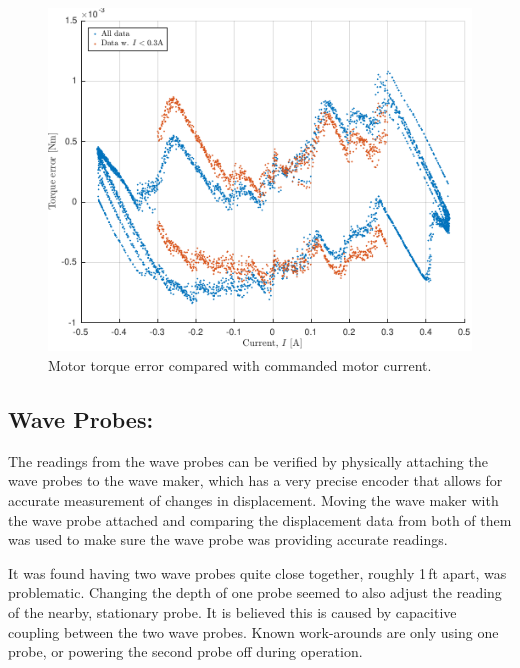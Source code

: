 \documentclass[hardware,article,submit,pdftex,moreauthors]{Definitions/mdpi}
\begin{document}
\begin{figure}[tb]
  \centering
  \includegraphics[width=1\textwidth]{diagrams/torque_error_3.pdf}
  \caption{Motor torque error compared with commanded motor current.}
  \label{fig:TorqueError}
\end{figure}

\subsection{Wave Probes:}	\label{waveprobes}
The readings from the wave probes can be verified by physically attaching the wave probes to the wave maker, which has a very precise encoder that allows for accurate measurement of changes in displacement.
Moving the wave maker with the wave probe attached and comparing the displacement data from both of them was used to make sure the wave probe was providing accurate readings.

It was found having two wave probes quite close together, roughly 1\,ft apart, was problematic.
Changing the depth of one probe seemed to also adjust the reading of the nearby, stationary probe.
It is believed this is caused by capacitive coupling between the two wave probes.
Known work-arounds are only using one probe, or powering the second probe off during operation.
\end{document}
